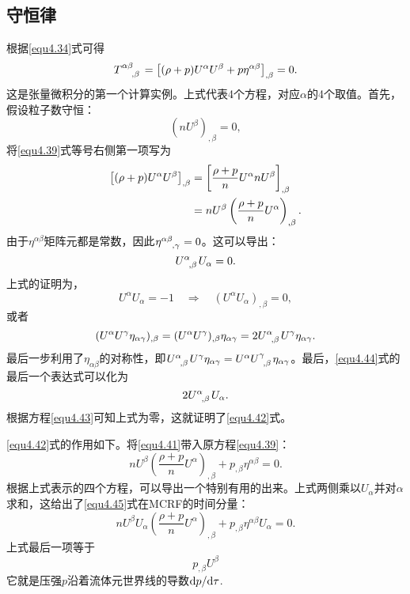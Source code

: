 \subsection*{守恒律}
根据\eqref{equ4.34}式可得
\begin{equation}
    T\indices{^{\alpha \beta}_{, \beta}} = \big[ (\rho + p)U^\alpha U^\beta + p \eta^{\alpha \beta} \big]_{, \beta} = 0.
\label{equ4.39}
\end{equation}
这是张量微积分的第一个计算实例。上式代表4个方程，对应$\alpha$的4个取值。首先，假设粒子数守恒：
\begin{equation}
    (n U^\beta)_{, \beta} = 0,
\label{equ4.40}
\end{equation}
将\eqref{equ4.39}式等号右侧第一项写为
\begin{align}
    \big[ (\rho + p)U^\alpha U^\beta \big]_{, \beta} &= \left[ \frac{\rho + p}{n} U^\alpha n U^\beta \right]_{, \beta} \notag \\
    &= nU^\beta \left( \frac{\rho + p}{n} U^\alpha \right)_{, \beta}. \label{equ4.41}
\end{align}
由于$\eta^{\alpha \beta}$矩阵元都是常数，因此$\eta\indices{^{\alpha \beta}_{, \gamma}} = 0$。这可以导出：
\begin{equation}
    U\indices{^\alpha_{, \beta}} U_\alpha = 0.
\label{equ4.42}
\end{equation}
上式的证明为，
\begin{equation}
    U^\alpha U_\alpha = -1 \quad \Rightarrow \quad (U^\alpha U_\alpha)_{, \beta} = 0,
\label{equ4.43}
\end{equation}
或者
\begin{equation}
    (U^\alpha U^\gamma \eta_{\alpha \gamma})_{, \beta} = (U^\alpha U^\gamma)_{, \beta} \eta_{\alpha \gamma} = 2 U\indices{^\alpha_{, \beta}} U^\gamma \eta_{\alpha \gamma}.
\label{equ4.44}
\end{equation}
最后一步利用了$\eta_{\alpha \beta}$的对称性，即$U\indices{^\alpha_{, \beta}} U^\gamma \eta_{\alpha \gamma} = U^\alpha U\indices{^\gamma_{, \beta}} \eta_{\alpha \gamma}$。最后，\eqref{equ4.44}式的最后一个表达式可以化为
\[
    2 U\indices{^\alpha_{, \beta}} U_\alpha.
\]
根据方程\eqref{equ4.43}可知上式为零，这就证明了\eqref{equ4.42}式。

\eqref{equ4.42}式的作用如下。将\eqref{equ4.41}带入原方程\eqref{equ4.39}：
\begin{equation}
    nU^\beta \left( \frac{\rho + p}{n} U^\alpha \right)_{, \beta} + p_{, \beta} \eta^{\alpha \beta} = 0.
\label{equ4.45}
\end{equation}
根据上式表示的四个方程，可以导出一个特别有用的出来。上式两侧乘以$U_\alpha$并对$\alpha$求和，这给出了\eqref{equ4.45}式在MCRF的时间分量：
\begin{equation}
    n U^\beta U_\alpha \left( \frac{\rho + p}{n} U^\alpha \right)_{, \beta} + p_{, \beta} \eta^{\alpha \beta} U_\alpha = 0.
\label{equ4.46}
\end{equation}
上式最后一项等于
\[
    p_{, \beta} U^\beta
\]
它就是压强$p$沿着流体元世界线的导数$\mathrm{d} p / \mathrm{d} \tau$. 

